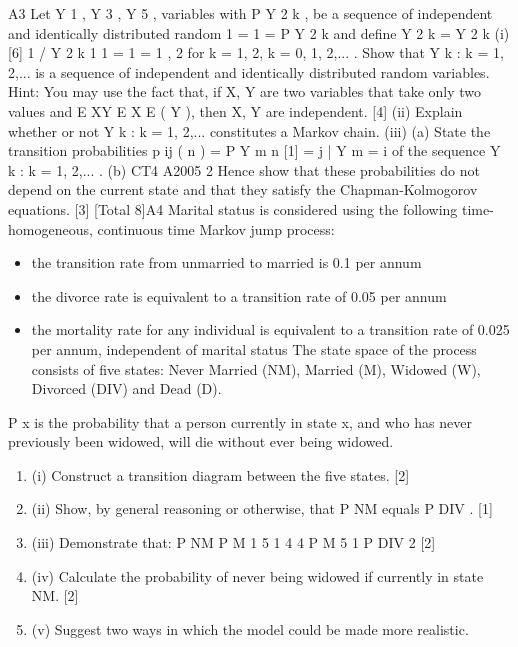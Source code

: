 \documentclass[a4paper,12pt]{article}
\begin{document}
\begin{enumerate}
A3
Let Y 1 , Y 3 , Y 5 ,
variables with
P Y 2 k
, be a sequence of independent and identically distributed random
1
= 1 = P Y 2 k
and define Y 2 k = Y 2 k
(i)
[6]
1 / Y 2 k 1
1
= 1 =
1
,
2
for k = 1, 2,
k = 0, 1, 2,...
.
Show that Y k : k = 1, 2,... is a sequence of independent and identically
distributed random variables.
Hint: You may use the fact that, if X, Y are two variables that take only two
values and E XY
E X E ( Y ), then X, Y are independent.
[4]
(ii) Explain whether or not Y k : k = 1, 2,... constitutes a Markov chain.
(iii) (a)
State the transition probabilities p ij ( n ) = P Y m
n
[1]
= j | Y m = i of the
sequence Y k : k = 1, 2,... .
(b)
CT4 A2005
2
Hence show that these probabilities do not depend on the current state
and that they satisfy the Chapman-Kolmogorov equations.
[3]
[Total 8]A4
Marital status is considered using the following time-homogeneous, continuous time
Markov jump process:
\begin{itemize}
\item the transition rate from unmarried to married is 0.1 per annum
\item the divorce rate is equivalent to a transition rate of 0.05 per annum
\item the mortality rate for any individual is equivalent to a transition rate of 0.025 per annum, independent of marital status
The state space of the process consists of five states: Never Married (NM),
Married (M), Widowed (W), Divorced (DIV) and Dead (D).
\end{itemize}
P x is the probability that a person currently in state x, and who has never previously
been widowed, will die without ever being widowed.
\begin{enumerate}
\item (i) Construct a transition diagram between the five states. [2]
\item (ii) Show, by general reasoning or otherwise, that P NM equals P DIV . [1]
\item (iii) Demonstrate that:
P NM
P M
1
5
1
4
4
P M
5
1
P DIV
2
[2]
\item (iv) Calculate the probability of never being widowed if currently in state NM. [2]
\item (v) Suggest two ways in which the model could be made more realistic.
\end{enumerate}

\newpage


\end{enumerate}
\end{document}
